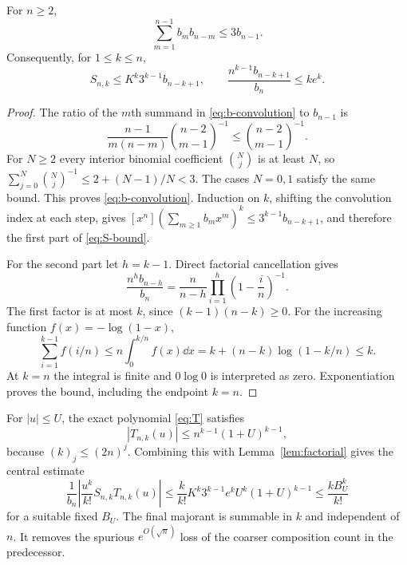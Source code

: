 \begin{lemma}\label{lem:factorial}
For $n\ge2$,
\begin{equation}\label{eq:b-convolution}
 \sum_{m=1}^{n-1}b_mb_{n-m}\le3b_{n-1}.
\end{equation}
Consequently, for $1\le k\le n$,
\begin{equation}\label{eq:S-bound}
 S_{n,k}\le K^k3^{k-1}b_{n-k+1},\qquad
 \frac{n^{k-1}b_{n-k+1}}{b_n}\le ke^k.
\end{equation}
\end{lemma}
\begin{proof}
The ratio of the $m$th summand in \eqref{eq:b-convolution} to $b_{n-1}$ is
\[
 \frac{n-1}{m(n-m)}\binom{n-2}{m-1}^{-1}
 \le\binom{n-2}{m-1}^{-1}.
\]
For $N\ge2$ every interior binomial coefficient $\binom Nj$ is at least
$N$, so
$\sum_{j=0}^N\binom Nj^{-1}\le2+(N-1)/N<3$.
The cases $N=0,1$ satisfy the same bound. This proves
\eqref{eq:b-convolution}. Induction on $k$, shifting the convolution index
at each step, gives
$[x^n](\sum_{m\ge1}b_mx^m)^k\le3^{k-1}b_{n-k+1}$, and therefore the first
part of \eqref{eq:S-bound}.

For the second part let $h=k-1$. Direct factorial cancellation gives
\begin{equation}\label{eq:ratio-exact}
 \frac{n^hb_{n-h}}{b_n}
 =\frac{n}{n-h}\prod_{i=1}^h\left(1-\frac in\right)^{-1}.
\end{equation}
The first factor is at most $k$, since $(k-1)(n-k)\ge0$.
For the increasing function $f(x)=-\log(1-x)$,
\[
 \sum_{i=1}^{k-1}f(i/n)
 \le n\int_0^{k/n}f(x)\dd x
 =k+(n-k)\log(1-k/n)\le k.
\]
At $k=n$ the integral is finite and $0\log0$ is interpreted as zero.
Exponentiation proves the bound, including the endpoint $k=n$.
\end{proof}

For $|u|\le U$, the exact polynomial \eqref{eq:T} satisfies
\begin{equation}\label{eq:T-bound}
 |T_{n,k}(u)|\le n^{k-1}(1+U)^{k-1},
\end{equation}
because $(k)_j\le(2n)^j$. Combining this with Lemma~\ref{lem:factorial}
gives the central estimate
\begin{equation}\label{eq:master-majorant}
 \frac1{b_n}\left|\frac{u^k}{k!}S_{n,k}T_{n,k}(u)\right|
 \le \frac{k}{k!}K^k3^{k-1}e^kU^k(1+U)^{k-1}
 \le \frac{kB_U^k}{k!}
\end{equation}
for a suitable fixed $B_U$. The final majorant is summable in $k$ and
independent of $n$. It removes the spurious $e^{O(\sqrt n)}$ loss of the
coarser composition count in the predecessor.

